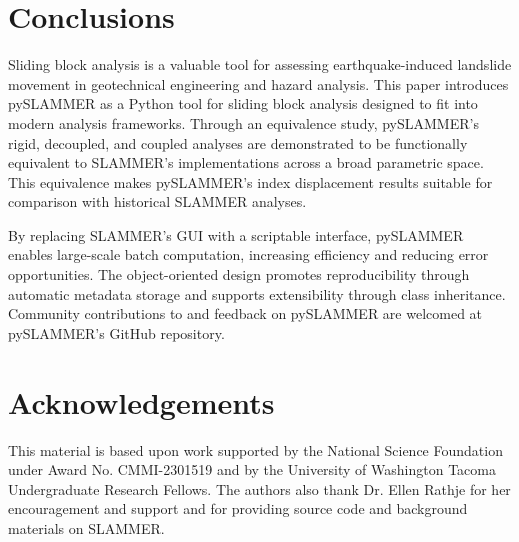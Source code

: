 \documentclass[preprint,review,12pt]{elsarticle}
\begin{document}
\section{Conclusions}

Sliding block analysis is a valuable tool for assessing earthquake-induced landslide movement in geotechnical engineering and hazard analysis.
This paper introduces pySLAMMER as a Python tool for sliding block analysis designed to fit into modern analysis frameworks.
Through an equivalence study, pySLAMMER's rigid, decoupled, and coupled analyses are demonstrated to be functionally equivalent to SLAMMER's implementations across a broad parametric space.
This equivalence makes pySLAMMER's index displacement results suitable for comparison with historical SLAMMER analyses.

By replacing SLAMMER's GUI with a scriptable interface, pySLAMMER enables large-scale batch computation, increasing efficiency and reducing error opportunities.
The object-oriented design promotes reproducibility through automatic metadata storage and supports extensibility through class inheritance.
Community contributions to and feedback on pySLAMMER are welcomed at pySLAMMER's GitHub repository.

\section*{Acknowledgements}
This material is based upon work supported by the National Science Foundation under Award No. CMMI-2301519 and by the University of Washington Tacoma Undergraduate Research Fellows.
The authors also thank Dr. Ellen Rathje for her encouragement and support and for providing source code and background materials on SLAMMER.







\end{document}
